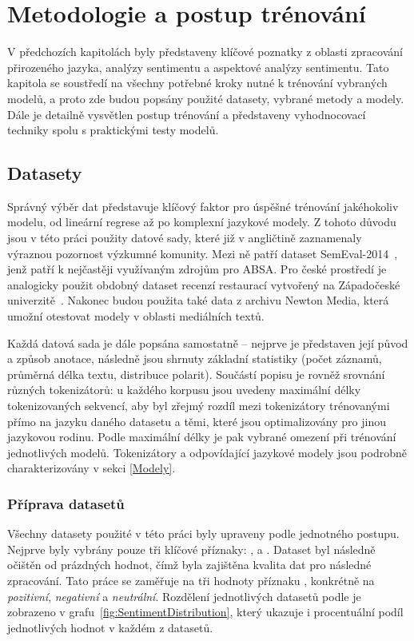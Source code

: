 \chapter{Metodologie a postup trénování}
V předchozích kapitolách byly představeny klíčové poznatky z oblasti zpracování přirozeného jazyka, analýzy sentimentu a aspektové analýzy sentimentu. Tato kapitola se soustředí na všechny potřebné kroky nutné k trénování vybraných modelů, a proto zde budou popsány použité datasety, vybrané metody a modely. Dále je detailně vysvětlen postup trénování a představeny vyhodnocovací techniky spolu s praktickými testy modelů.

\section{Datasety}\label{datasety}
Správný výběr dat představuje klíčový faktor pro úspěšné trénování jakéhokoliv modelu, od lineární regrese až po komplexní jazykové modely. Z tohoto důvodu jsou v této práci použity datové sady, které již v angličtině zaznamenaly výraznou pozornost výzkumné komunity. Mezi ně patří dataset SemEval-2014~\cite{pontiki-etal-2014-semeval}, jenž patří k nejčastěji využívaným zdrojům pro ABSA. Pro české prostředí je analogicky použit obdobný dataset recenzí restaurací vytvořený na Západočeské univerzitě~\cite{steinberger-etal-2014-aspect}. Nakonec budou použita také data z archivu Newton Media, která umožní otestovat modely v oblasti mediálních textů.

Každá datová sada je dále popsána samostatně -- nejprve je představen její původ a způsob anotace, následně jsou shrnuty základní statistiky (počet záznamů, průměrná délka textu, distribuce polarit). Součástí popisu je rovněž srovnání různých tokenizátorů: u každého korpusu jsou uvedeny maximální délky tokenizovaných sekvencí, aby byl zřejmý rozdíl mezi tokenizátory trénovanými přímo na jazyku daného datasetu a těmi, které jsou optimalizovány pro jinou jazykovou rodinu. Podle maximální délky je pak vybrané omezení při trénování jednotlivých modelů. Tokenizátory a odpovídající jazykové modely jsou podrobně charakterizovány v sekci \ref{Modely}.

\subsection{Příprava datasetů}
Všechny datasety použité v této práci byly upraveny podle jednotného postupu. Nejprve byly vybrány pouze tři klíčové příznaky: ,  a . Dataset byl následně očištěn od prázdných hodnot, čímž byla zajištěna kvalita dat pro následné zpracování. Tato práce se zaměřuje na tři hodnoty příznaku , konkrétně na \emph{pozitivní}, \emph{negativní} a \emph{neutrální}. Rozdělení jednotlivých datasetů podle  je zobrazeno v grafu~\ref{fig:SentimentDistribution}, který ukazuje i procentuální podíl jednotlivých hodnot  v každém z datasetů.

